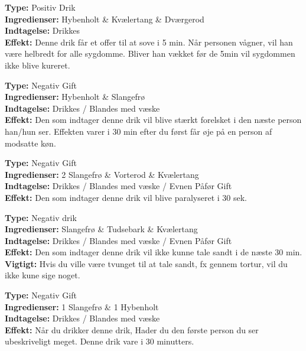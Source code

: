 \begin{drik*}
\textbf{Type:} Positiv Drik\\
\textbf{Ingredienser:} Hybenholt \& Kvælertang \& Dværgerod\\
\textbf{Indtagelse:} Drikkes\\
\textbf{Effekt:} Denne drik får et offer til at sove i 5 min. Når personen vågner, vil han være helbredt for alle sygdomme. Bliver han vækket før de 5min vil sygdommen ikke blive kureret.\\
\end{drik*}

\begin{gift*}[Kærlighedsdrik]
\textbf{Type:} Negativ Gift\\
\textbf{Ingredienser:} Hybenholt \& Slangefrø\\
\textbf{Indtagelse:} Drikkes / Blandes med væske\\
\textbf{Effekt:} Den som indtager denne drik vil blive stærkt forelsket i den næste person han/hun ser. Effekten varer i 30 min efter du først får øje på en person af modsatte køn.\\
\end{gift*}

\begin{gift*}[Paralysedrik]
\textbf{Type:} Negativ Gift\\
\textbf{Ingredienser:} 2 Slangefrø \& Vorterod \& Kvælertang\\
\textbf{Indtagelse:} Drikkes / Blandes med væske / Evnen Påfør Gift\\
\textbf{Effekt:} Den som indtager denne drik vil blive paralyseret i 30 sek.\\
\end{gift*}

\begin{gift*}
\textbf{Type:} Negativ drik\\
\textbf{Ingredienser:} Slangefrø \& Tudsebark \& Kvælertang\\
\textbf{Indtagelse:} Drikkes / Blandes med væske / Evnen Påfør Gift\\
\textbf{Effekt:} Den som indtager denne drik vil ikke kunne tale sandt i de næste 30 min.\\
\textbf{Vigtigt:} Hvis du ville være tvunget til at tale sandt, fx gennem tortur, vil du ikke kune sige noget.
\end{gift*}

\begin{gift*}
\textbf{Type:} Negativ Gift\\
\textbf{Ingredienser:} 1 Slangefrø \& 1 Hybenholt \\
\textbf{Indtagelse:} Drikkes / Blandes med væske\\
\textbf{Effekt:} Når du drikker denne drik, Hader du den første person du ser ubeskriveligt meget. Denne drik vare i 30 minutters.
\end{gift*}

